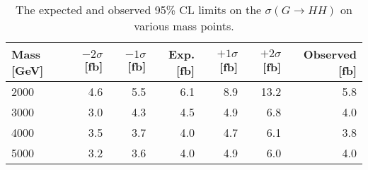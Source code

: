 \begin{table}[htbp]
    \caption{The expected and observed 95\% CL limits on the $\sigma(G\rightarrow HH)$ on various mass points.}
    \label{tab:limits}
    \centering
    \begin{tabular}{lrrrrrr}
        \toprule
        Mass [GeV] & $-2\sigma$ [fb]   & $-1\sigma$ [fb]   & Exp. [fb]   & $+1\sigma$ [fb]   & $+2\sigma$ [fb] & Observed [fb]\\
        \midrule
        2000       & 4.6               & 5.5               & 6.1         & 8.9               & 13.2            & 5.8\\
        3000       & 3.0               & 4.3               & 4.5         & 4.9               & 6.8             & 4.0\\
        4000       & 3.5               & 3.7               & 4.0         & 4.7               & 6.1             & 3.8\\
        5000       & 3.2               & 3.6               & 4.0         & 4.9               & 6.0             & 4.0\\
        \bottomrule
    \end{tabular}
\end{table}